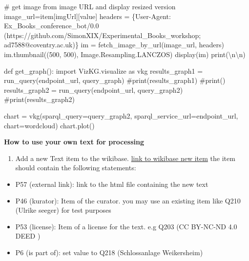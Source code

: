 \documentclass[
  letterpaper,
]{book}
\newenvironment{Shaded}{\begin{snugshade}}{\end{snugshade}}
\newcommand{\BuiltInTok}[1]{\textcolor[rgb]{0.00,0.23,0.31}{#1}}
\newcommand{\CharTok}[1]{\textcolor[rgb]{0.13,0.47,0.30}{#1}}
\newcommand{\CommentTok}[1]{\textcolor[rgb]{0.37,0.37,0.37}{#1}}
\newcommand{\DecValTok}[1]{\textcolor[rgb]{0.68,0.00,0.00}{#1}}
\newcommand{\ImportTok}[1]{\textcolor[rgb]{0.00,0.46,0.62}{#1}}
\newcommand{\KeywordTok}[1]{\textcolor[rgb]{0.00,0.23,0.31}{#1}}
\newcommand{\NormalTok}[1]{\textcolor[rgb]{0.00,0.23,0.31}{#1}}
\newcommand{\OperatorTok}[1]{\textcolor[rgb]{0.37,0.37,0.37}{#1}}
\newcommand{\StringTok}[1]{\textcolor[rgb]{0.13,0.47,0.30}{#1}}
\providecommand{\tightlist}{%
  \setlength{\itemsep}{0pt}\setlength{\parskip}{0pt}}\usepackage{longtable,booktabs,array}
\begin{document}
\begin{Shaded}
\begin{Highlighting}[]
      \CommentTok{\# get image from image URL and display resized version}
\NormalTok{      image\_url}\OperatorTok{=}\NormalTok{item[}\StringTok{\textquotesingle{}imgUrl\textquotesingle{}}\NormalTok{][}\StringTok{\textquotesingle{}value\textquotesingle{}}\NormalTok{]}
\NormalTok{      headers }\OperatorTok{=}\NormalTok{ \{}\StringTok{\textquotesingle{}User{-}Agent\textquotesingle{}}\NormalTok{: }\StringTok{\textquotesingle{}Ex\_Books\_conference\_bot/0.0 (https://github.com/SimonXIX/Experimental\_Books\_workshop; ad7588@coventry.ac.uk)\textquotesingle{}}\NormalTok{\}}
\NormalTok{      im }\OperatorTok{=}\NormalTok{ fetch\_image\_by\_url(image\_url, headers)}
\NormalTok{      im.thumbnail((}\DecValTok{500}\NormalTok{, }\DecValTok{500}\NormalTok{), Image.Resampling.LANCZOS)}
\NormalTok{      display(im)}
      \BuiltInTok{print}\NormalTok{(}\StringTok{\textquotesingle{}}\CharTok{\textbackslash{}n\textbackslash{}n}\StringTok{\textquotesingle{}}\NormalTok{)}

\KeywordTok{def}\NormalTok{ get\_graph():}
    \ImportTok{import}\NormalTok{ VizKG.visualize }\ImportTok{as}\NormalTok{ vkg}
\NormalTok{    results\_graph1 }\OperatorTok{=}\NormalTok{ run\_query(endpoint\_url, query\_graph)}
    \CommentTok{\#print(results\_graph1)}
    \CommentTok{\#print(\textquotesingle{}{-}{-}{-}\textquotesingle{})}
\NormalTok{    results\_graph2 }\OperatorTok{=}\NormalTok{ run\_query(endpoint\_url, query\_graph2)}
    \CommentTok{\#print(results\_graph2)}

\NormalTok{    chart }\OperatorTok{=}\NormalTok{ vkg(sparql\_query}\OperatorTok{=}\NormalTok{query\_graph2, sparql\_service\_url}\OperatorTok{=}\NormalTok{endpoint\_url, chart}\OperatorTok{=}\StringTok{\textquotesingle{}wordcloud\textquotesingle{}}\NormalTok{)}
\NormalTok{    chart.plot()}
\end{Highlighting}
\end{Shaded}

\textbf{How to use your own text for processing}

\begin{enumerate}
\def\labelenumi{\arabic{enumi}.}
\tightlist
\item
  Add a new Text item to the wikibase.
  \href{https://computational-publishing-service.wikibase.cloud/wiki/Special:NewItem}{link
  to wikibase new item} the item should contain the following
  statements:
\end{enumerate}

\begin{itemize}
\tightlist
\item
  P57 (external link): link to the html file containing the new text
\item
  P46 (kurator): Item of the curator. you may use an existing item like
  Q210 (Ulrike seeger) for test purposes
\item
  P53 (license): Item of a license for the text. e.g Q203 (CC BY-NC-ND
  4.0 DEED )
\item
  P6 (is part of): set value to Q218 (Schlossanlage Weikersheim)
\end{itemize}
\end{document}
